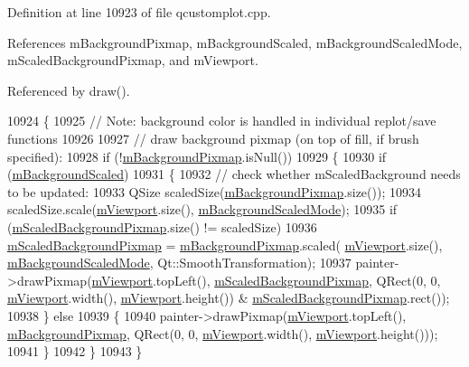 Definition at line 10923 of file qcustomplot.\+cpp.



References m\+Background\+Pixmap, m\+Background\+Scaled, m\+Background\+Scaled\+Mode, m\+Scaled\+Background\+Pixmap, and m\+Viewport.



Referenced by draw().


\begin{DoxyCode}
10924 \{
10925   \textcolor{comment}{// Note: background color is handled in individual replot/save functions}
10926 
10927   \textcolor{comment}{// draw background pixmap (on top of fill, if brush specified):}
10928   \textcolor{keywordflow}{if} (!\hyperlink{class_q_custom_plot_ae8f4677399324a78c5f8dbfb95a34f90}{mBackgroundPixmap}.isNull())
10929   \{
10930     \textcolor{keywordflow}{if} (\hyperlink{class_q_custom_plot_a62fe584b20680b1b2e1c7efb5c5416a5}{mBackgroundScaled})
10931     \{
10932       \textcolor{comment}{// check whether mScaledBackground needs to be updated:}
10933       QSize scaledSize(\hyperlink{class_q_custom_plot_ae8f4677399324a78c5f8dbfb95a34f90}{mBackgroundPixmap}.size());
10934       scaledSize.scale(\hyperlink{class_q_custom_plot_ac0a7c38a715526c257cff95774f83ab6}{mViewport}.size(), \hyperlink{class_q_custom_plot_ab82e8a5e3ad6b486f95d6da8bf49e9aa}{mBackgroundScaledMode});
10935       \textcolor{keywordflow}{if} (\hyperlink{class_q_custom_plot_a081bf046501d52642dc6d7e3bdb97d57}{mScaledBackgroundPixmap}.size() != scaledSize)
10936         \hyperlink{class_q_custom_plot_a081bf046501d52642dc6d7e3bdb97d57}{mScaledBackgroundPixmap} = \hyperlink{class_q_custom_plot_ae8f4677399324a78c5f8dbfb95a34f90}{mBackgroundPixmap}.scaled(
      \hyperlink{class_q_custom_plot_ac0a7c38a715526c257cff95774f83ab6}{mViewport}.size(), \hyperlink{class_q_custom_plot_ab82e8a5e3ad6b486f95d6da8bf49e9aa}{mBackgroundScaledMode}, Qt::SmoothTransformation);
10937       painter->drawPixmap(\hyperlink{class_q_custom_plot_ac0a7c38a715526c257cff95774f83ab6}{mViewport}.topLeft(), \hyperlink{class_q_custom_plot_a081bf046501d52642dc6d7e3bdb97d57}{mScaledBackgroundPixmap}, 
      QRect(0, 0, \hyperlink{class_q_custom_plot_ac0a7c38a715526c257cff95774f83ab6}{mViewport}.width(), \hyperlink{class_q_custom_plot_ac0a7c38a715526c257cff95774f83ab6}{mViewport}.height()) & 
      \hyperlink{class_q_custom_plot_a081bf046501d52642dc6d7e3bdb97d57}{mScaledBackgroundPixmap}.rect());
10938     \} \textcolor{keywordflow}{else}
10939     \{
10940       painter->drawPixmap(\hyperlink{class_q_custom_plot_ac0a7c38a715526c257cff95774f83ab6}{mViewport}.topLeft(), \hyperlink{class_q_custom_plot_ae8f4677399324a78c5f8dbfb95a34f90}{mBackgroundPixmap}, QRect(0, 0, 
      \hyperlink{class_q_custom_plot_ac0a7c38a715526c257cff95774f83ab6}{mViewport}.width(), \hyperlink{class_q_custom_plot_ac0a7c38a715526c257cff95774f83ab6}{mViewport}.height()));
10941     \}
10942   \}
10943 \}
\end{DoxyCode}


